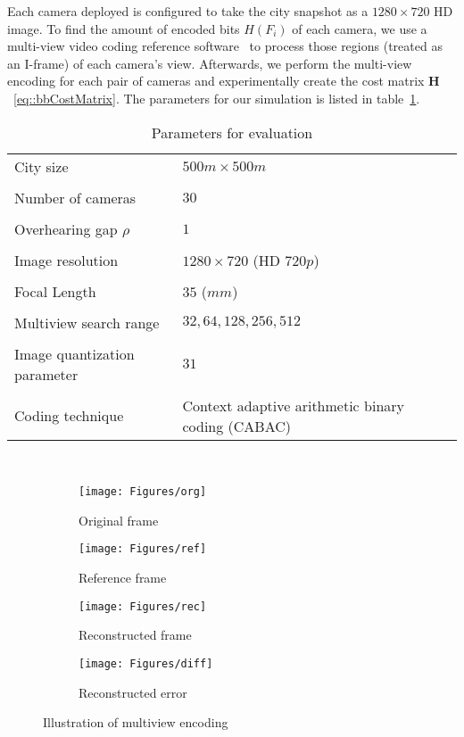 Each camera deployed is configured to take the city snapshot as a $1280 \times 720$ HD image.
To find the amount of encoded bits $H(F_i)$ of each camera, we use a multi-view video coding reference software~\cite{JMVC} to process those regions (treated as an I-frame) of each camera's view.
Afterwards, we perform the multi-view encoding for each pair of cameras and experimentally create the cost matrix $\mathbf{H}$~\eqref{eq::bbCostMatrix}.
The parameters for our simulation is listed in table~\ref{tab::evaParameters}.
%
\begin{table}[htb]
\footnotesize
\centering
\begin{tabularx}{0.9\columnwidth}{X|X}
  \hline
  City size & $500m \times 500m$ \\ \\
  Number of cameras & $30$ \\ \\
  Overhearing gap $\rho$ & $1$ \\ \\
  Image resolution & $1280 \times 720$ (HD $720p$) \\ \\
  Focal Length & $35$ ($mm$) \\ \\
  Multiview search range & $32,64,128,256,512$ \\ \\
  Image quantization parameter & $31$ \\ \\
  Coding technique & Context adaptive arithmetic binary coding (CABAC) \\
  \hline
\end{tabularx}
\\
\caption{\label{tab::evaParameters}Parameters for evaluation}
\end{table}
%
\begin{figure}
\begin{center}
\begin{subfigure}[b]{0.45\columnwidth}
\texttt{[image: Figures/org]}
\caption{Original frame}
\end{subfigure}
%
\begin{subfigure}[b]{0.45\columnwidth}
\texttt{[image: Figures/ref]}
\caption{Reference frame}
\end{subfigure}
%
\begin{subfigure}[b]{0.45\columnwidth}
\texttt{[image: Figures/rec]}
\caption{Reconstructed frame}
\end{subfigure}
%
\begin{subfigure}[b]{0.45\columnwidth}
\texttt{[image: Figures/diff]}
\caption{Reconstructed error}
\end{subfigure}
%
\caption{\label{fig::multiViewImageDemo} Illustration of multiview encoding}
\end{center}
\end{figure}
%

